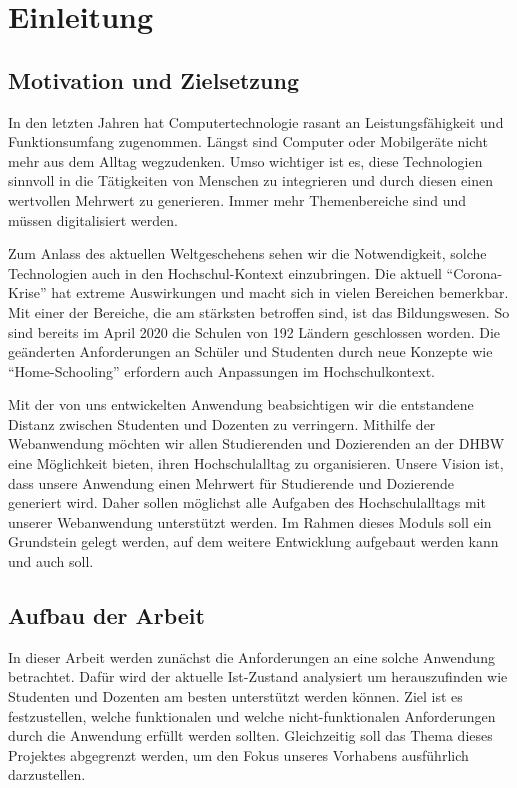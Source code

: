 \chapter{Einleitung}
\section{Motivation und Zielsetzung}
In den letzten Jahren hat Computertechnologie rasant an Leistungsfähigkeit und Funktionsumfang zugenommen.
Längst sind Computer oder Mobilgeräte nicht mehr aus dem Alltag wegzudenken.
Umso wichtiger ist es, diese Technologien sinnvoll in die Tätigkeiten von Menschen zu integrieren und durch diesen einen wertvollen Mehrwert zu generieren.
Immer mehr Themenbereiche sind und müssen digitalisiert werden.

Zum Anlass des aktuellen Weltgeschehens sehen wir die Notwendigkeit, solche Technologien auch in den Hochschul-Kontext einzubringen.
Die aktuell \enquote{Corona-Krise} hat extreme Auswirkungen und macht sich in vielen Bereichen bemerkbar.
Mit einer der Bereiche, die am stärksten betroffen sind, ist das Bildungswesen.
So sind bereits im April 2020 die Schulen von 192 Ländern geschlossen worden.\autocite[S. 845]{Donohue2020}
Die geänderten Anforderungen an Schüler und Studenten durch neue Konzepte wie \enquote{Home-Schooling} erfordern auch Anpassungen im Hochschulkontext.

Mit der von uns entwickelten Anwendung beabsichtigen wir die entstandene Distanz zwischen Studenten und Dozenten zu verringern. 
Mithilfe der Webanwendung möchten wir allen Studierenden und Dozierenden an der DHBW eine Möglichkeit bieten, ihren Hochschulalltag zu organisieren. 
Unsere Vision ist, dass unsere Anwendung einen Mehrwert für Studierende und Dozierende generiert wird.
Daher sollen möglichst alle Aufgaben des Hochschulalltags mit unserer Webanwendung unterstützt werden. 
Im Rahmen dieses Moduls soll ein Grundstein gelegt werden, auf dem weitere Entwicklung aufgebaut werden kann und auch soll.

\clearpage
\section{Aufbau der Arbeit} %
In dieser Arbeit werden zunächst die Anforderungen an eine solche Anwendung betrachtet.
Dafür wird der aktuelle Ist-Zustand analysiert um herauszufinden wie Studenten und Dozenten am besten unterstützt werden können.
Ziel ist es festzustellen, welche funktionalen und welche nicht-funktionalen Anforderungen durch die Anwendung erfüllt werden sollten.
Gleichzeitig soll das Thema dieses Projektes abgegrenzt werden, um den Fokus unseres Vorhabens ausführlich darzustellen.

